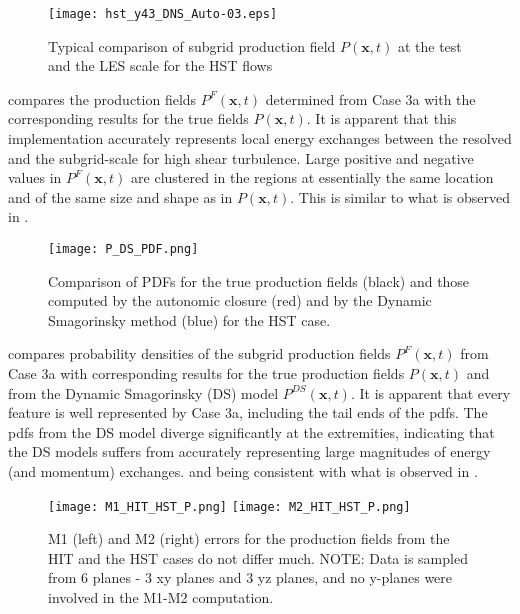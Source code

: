 %
\begin{figure}
	\begin{center}
	\texttt{[image: hst\_y43\_DNS\_Auto-03.eps]}
	\caption{Typical comparison of subgrid production field $P(\mathbf{x},t)$ at the test and the LES scale for the HST flows }
	\label{F:P_SS}
	\end{center}
\end{figure}
%
%

  compares the production fields $P^F(\mathbf{x},t)$ determined from Case 3a  with the corresponding results for the true fields $P(\mathbf{x},t)$. It is apparent that this implementation accurately represents local energy exchanges between the resolved and the subgrid-scale for high shear turbulence. Large positive and negative values in $P^F(\mathbf{x},t)$ are clustered in the regions at essentially the same location and of the same size and shape as in $P(\mathbf{x},t)$. This is similar to what is observed in . 


%
\begin{figure}
	\begin{center}
	\texttt{[image: P\_DS\_PDF.png]}
	\caption{Comparison of PDFs for the true production fields (black) and those computed by the autonomic closure (red) and by the Dynamic Smagorinsky method (blue) for the HST case.}
	\label{F:PDF_HST}
	\end{center}
\end{figure}
%
%


 compares probability densities of the subgrid production fields $P^F(\mathbf{x},t)$ from Case 3a with corresponding results for the true production fields $P(\mathbf{x},t)$  and from the Dynamic Smagorinsky (DS) model $P^{DS}(\mathbf{x},t)$. It is apparent that every feature is well represented by Case 3a, including the tail ends of the pdfs. The pdfs from the DS model diverge significantly at the extremities, indicating that the DS models suffers from accurately representing large magnitudes of energy (and momentum) exchanges. and being consistent with what is observed in . 



%
\begin{figure}
	\begin{center}
	\texttt{[image: M1\_HIT\_HST\_P.png]}
	\texttt{[image: M2\_HIT\_HST\_P.png]}
	\caption{M1 (left) and M2 (right) errors for the production fields from the HIT and the HST cases do not differ much. NOTE: Data is sampled from 6 planes - 3 xy planes and 3 yz planes, and no y-planes were involved in the M1-M2 computation.}
	\label{F:M1M2_HST}
	\end{center}
\end{figure}
%
%



